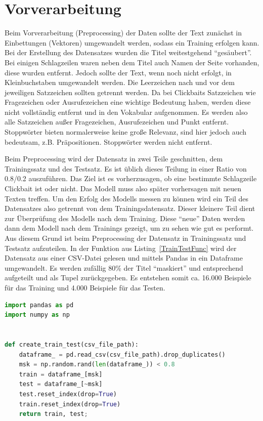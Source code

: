 \section{Vorverarbeitung}
Beim Vorverarbeitung (Preprocessing) der Daten sollte der Text zunächst in Einbettungen (Vektoren) umgewandelt werden, sodass ein Training erfolgen kann. Bei der Erstellung des Datensatzes wurden die Titel weitestgehend \enquote{gesäubert}. Bei einigen Schlagzeilen waren neben dem Titel auch Namen der Seite vorhanden, diese wurden entfernt. Jedoch sollte der Text, wenn noch nicht erfolgt, in Kleinbuchstaben umgewandelt werden. Die Leerzeichen nach und vor dem jeweiligen Satzzeichen sollten getrennt werden. Da bei Clickbaits Satzzeichen wie Fragezeichen oder Ausrufezeichen eine wichtige Bedeutung haben, werden diese nicht vollständig entfernt und in den Vokabular aufgenommen. Es werden also alle Satzzeichen außer Fragezeichen, Ausrufezeichen und Punkt entfernt. Stoppwörter bieten normalerweise keine große Relevanz, sind hier jedoch auch bedeutsam, z.B. Präpositionen. Stoppwörter werden nicht entfernt.

Beim Preprocessing wird der Datensatz in zwei Teile geschnitten, dem Trainingssatz und des Testsatz. Es ist üblich dieses Teilung in einer Ratio von 0.8/0.2 auszuführen. Das Ziel ist es vorherzusagen, ob eine bestimmte Schlagzeile Clickbait ist oder nicht. Das Modell muss also später vorhersagen mit neuen Texten treffen. Um den Erfolg des Modells messen zu können wird ein Teil des Datensatzes also getrennt von dem Trainingsdatensatz. Dieser kleinere Teil dient zur Überprüfung des Modells nach dem Training. Diese \enquote{neue} Daten werden dann dem Modell nach dem Trainings gezeigt, um zu sehen wie gut es performt. Aus diesem Grund ist beim Preprocessing der Datensatz in Trainingssatz und Testsatz aufzuteilen. In der Funktion aus Listing~\ref{TrainTestFunc} wird der Datensatz aus einer CSV-Datei gelesen und mittels Pandas in ein Dataframe umgewandelt. Es werden zufällig 80\% der Titel \enquote{maskiert} und entsprechend aufgeteilt und als Tupel zurückgegeben. Es entstehen somit ca. 16.000 Beispiele für das Training und 4.000 Beispiele für das Testen.

\begin{lstlisting}[language=Python,caption=Funktion für das Aufteilen des Datensatzes, label={TrainTestFunc}]
import pandas as pd
import numpy as np


def create_train_test(csv_file_path):
    dataframe_ = pd.read_csv(csv_file_path).drop_duplicates()
    msk = np.random.rand(len(dataframe_)) < 0.8
    train = dataframe_[msk]
    test = dataframe_[~msk]
    test.reset_index(drop=True)
    train.reset_index(drop=True)
    return train, test;
\end{lstlisting}

